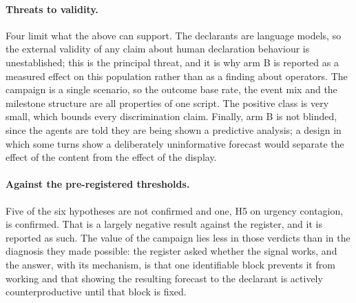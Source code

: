 \paragraph{Threats to validity.}
Four limit what the above can support. The declarants are language models, so the external
validity of any claim about human declaration behaviour is unestablished; this is the
principal threat, and it is why arm B is reported as a measured effect on this population
rather than as a finding about operators. The campaign is a single scenario, so the outcome
base rate, the event mix and the milestone structure are all properties of one script. The
positive class is very small, which bounds every discrimination claim. Finally, arm B is
not blinded, since the agents are told they are being shown a predictive analysis; a design
in which some turns show a deliberately uninformative forecast would separate the effect of
the content from the effect of the display.

\paragraph{Against the pre-registered thresholds.}
Five of the six hypotheses are not confirmed and one, H5 on urgency contagion, is confirmed.
That is a largely negative result against the register, and it is reported as such. The
value of the campaign lies less in those verdicts than in the diagnosis they made possible:
the register asked whether the signal works, and the answer, with its mechanism, is that one
identifiable block prevents it from working and that showing the resulting forecast to the
declarant is actively counterproductive until that block is fixed.

